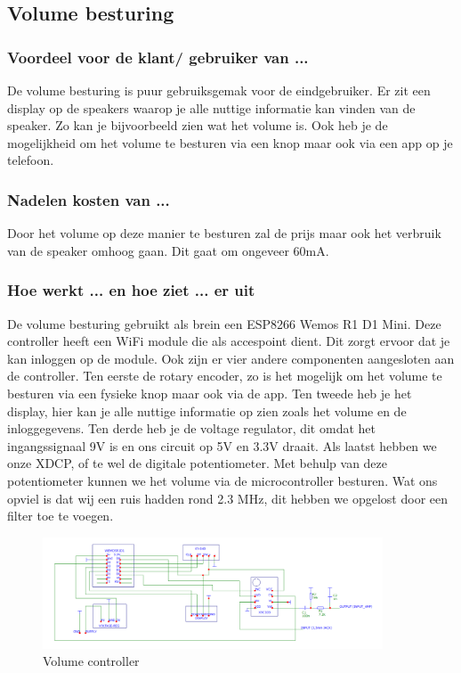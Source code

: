 \subsection{Volume besturing}
\subsubsection{Voordeel voor de klant/ gebruiker van ...}
De volume besturing is puur gebruiksgemak voor de eindgebruiker. Er zit een display op de speakers waarop je alle nuttige informatie kan vinden van de speaker. Zo kan je bijvoorbeeld zien wat het volume is. Ook heb je de mogelijkheid om het volume te besturen via een knop maar ook via een app op je telefoon.
\subsubsection{Nadelen kosten van ...}
Door het volume op deze manier te besturen zal de prijs maar ook het verbruik van de speaker omhoog gaan. Dit gaat om ongeveer 60mA. 
\subsubsection{Hoe werkt ... en hoe ziet ... er uit}
De volume besturing gebruikt als brein een ESP8266 Wemos R1 D1 Mini. Deze controller heeft een WiFi module die als accespoint dient. Dit zorgt ervoor dat je kan inloggen op de module. Ook zijn er vier andere componenten aangesloten aan de controller. Ten eerste de rotary encoder, zo is het mogelijk om het volume te besturen via een fysieke knop maar ook via de app. Ten tweede heb je het display, hier kan je alle nuttige informatie op zien zoals het volume en de inloggegevens. Ten derde heb je de voltage regulator, dit omdat het ingangssignaal 9V is en ons circuit op 5V en 3.3V draait. Als laatst hebben we onze XDCP, of te wel de digitale potentiometer. Met behulp van deze potentiometer kunnen we het volume via de microcontroller besturen. Wat ons opviel is dat wij een ruis hadden rond 2.3 MHz, dit hebben we opgelost door een filter toe te voegen.

\begin{figure}[ht]
    \centering
    \includegraphics[width=0.90\textwidth]{IMG/004/Vol_ctr.png}
    \caption{Volume controller}
    \label{fig:Volume Controller}
\end{figure}